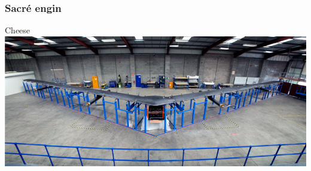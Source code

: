\documentclass{beamer}
\begin{document}
\begin{frame}
  \frametitle{Sacré engin}
  \begin{block}{Cheese}
      \includegraphics[width=\textwidth]{../Images/facebook_aquila.png}
  \end{block}
\end{frame}
\end{document}
